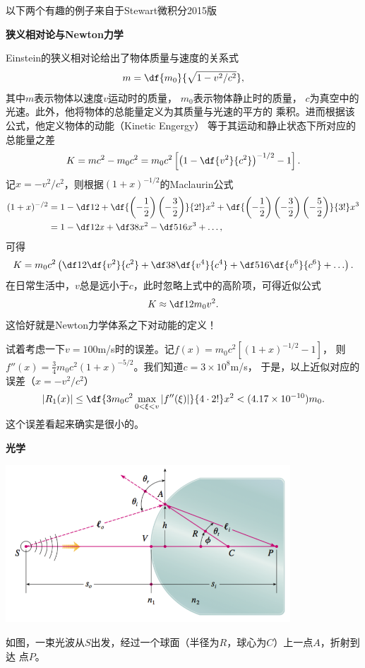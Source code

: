 \begin{shaded}
	{\kaishu 以下两个有趣的例子来自于Stewart微积分2015版}

	{\bf 狭义相对论与Newton力学}
	
	Einstein的狭义相对论给出了物体质量与速度的关系式
	$$m=\df{m_0}{\sqrt{1-v^2/c^2}},$$
	其中$m$表示物体以速度$v$运动时的质量，	$m_0$表示物体静止时的质量，
	$c$为真空中的光速。此外，他将物体的总能量定义为其质量与光速的平方的
	乘积。进而根据该公式，他定义物体的动能（Kinetic Engergy）
	等于其运动和静止状态下所对应的总能量之差
	$$K=mc^2-m_0c^2=m_0c^2
	\left[\left(1-\df{v^2}{c^2}\right)^{-1/2}-1\right].$$
	记$x=-v^2/c^2$，则根据$(1+x)^{-1/2}$的Maclaurin公式
	\begin{align*}
		(1+x)^{-/2}
		&=1-\df12+\df{\left(-\frac12\right)\left(-\frac32\right)}{2!}x^2
		+\df{\left(-\frac12\right)\left(-\frac32\right)\left(-\frac52\right)}{3!}x^3\\
		&=1-\df12x+\df38x^2-\df5{16}x^3+\ldots,
	\end{align*}
	可得
	$$K=m_0c^2\left(\df12\df{v^2}{c^2}+\df38\df{v^4}{c^4}
	+\df5{16}\df{v^6}{c^6}+\ldots\right).$$
	在日常生活中，$v$总是远小于$c$，此时忽略上式中的高阶项，可得近似公式
	$$K\approx \df12m_0v^2.$$
	这恰好就是Newton力学体系之下对动能的定义！
	
	试着考虑一下$v=100$m/s时的误差。记$f(x)=m_0c^2[(1+x)^{-1/2}-1]$，
	则$f''(x)=\frac34m_0c^2(1+x)^{-5/2}$。我们知道$c=3\times 10^8$m/s，
	于是，以上近似对应的误差（$x=-v^2/c^2$）
	$$|R_1(x)|\leq\df{3m_0c^2\max\limits_{0<\xi<v}|f''(\xi)|}{4\cdot2!}x^2
	<(4.17\times 10^{-10})m_0.$$
	这个误差看起来确实是很小的。
	
	{\bf 光学}
	\begin{center}
		\includegraphics[width=0.8\textwidth]{./images/ch12/refractionSph.png}
	\end{center}
	
	如图，一束光波从$S$出发，经过一个球面（半径为$R$，球心为$C$）上一点$A$，折射到达
	点$P$。
	

\end{shaded}
